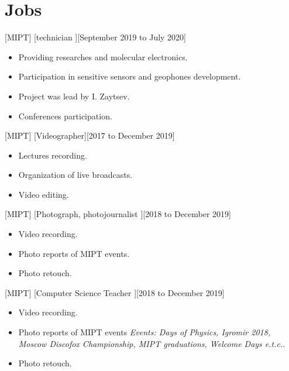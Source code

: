 \documentclass{article}
\begin{document}
\section{Jobs}

[MIPT]
[technician ][September 2019 to July 2020]

\begin{itemize}
\item Providing researches and molecular electronics.
\item Participation in sensitive sensors and geophones development.
\item Project was lead by I. Zaytsev.
\item Conferences participation.
\end{itemize}

[MIPT]
[Videographer][2017 to December 2019]

\begin{itemize}
\item Lectures recording.
\item Organization of live broadcasts.
\item Video editing.
\end{itemize}

[MIPT]
[Photograph, photojournalist ][2018 to December 2019]

\begin{itemize}
\item Video recording.
\item Photo reports of MIPT events.
\item Photo retouch.
\end{itemize}

[MIPT]
[Computer Science Teacher ][2018 to December 2019]

\begin{itemize}
\item Video recording.
\item Photo reports of MIPT events \textit{Events: Days of Physics, Igromir 2018, Moscow Discofox Championship, MIPT graduations, Welcome Days e.t.c.}.
\item Photo retouch.
\end{itemize}
\end{document}
